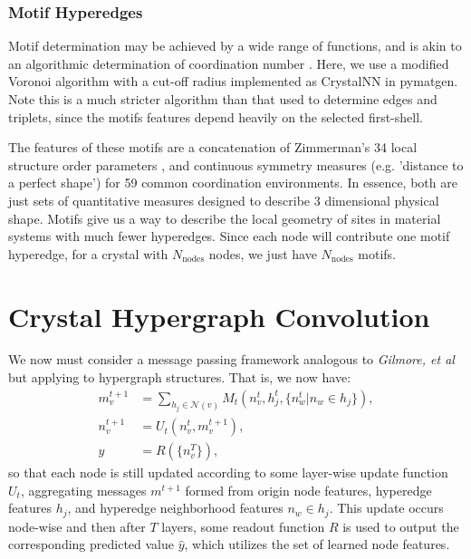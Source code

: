 \documentclass[10pt,a4paper,twocolumn]{article}
\begin{document}






\subsubsection{Motif Hyperedges}
Motif determination may be achieved by a wide range of functions, and is akin to an algorithmic determination of coordination number \cite{coordination_comp}. Here, we use a modified Voronoi algorithm with a cut-off radius implemented as CrystalNN in pymatgen.
Note this is a much stricter algorithm than that used to determine edges and triplets, since the motifs features depend heavily on the selected first-shell.

The features of these motifs are a concatenation of Zimmerman's 34 local structure order parameters \cite{orderparam1,orderparam2}, and continuous symmetry measures \cite{csm_polyhedra} (e.g. 'distance to a perfect shape') for 59 common coordination environments. In essence, both are just sets of quantitative measures designed to describe 3 dimensional physical shape. 
Motifs give us a way to describe the local geometry of sites in material systems with much fewer hyperedges. Since each node will contribute one motif hyperedge, for a crystal with $N_{\text{nodes}}$ nodes, we just have $N_{\text{nodes}}$ motifs. 


\section{Crystal Hypergraph Convolution}

We now must consider a message passing framework analogous to \textit{Gilmore, et al} \cite{mpnn} but applying to hypergraph structures. That is, we now have:
\begin{align*}
	m_v^{t+1}&=\sum_{h_j\in \mathcal{N}(v)} M_t(n_v^{t},h_j^{t},\lbrace n_w^t \vert n_w \in h_j \rbrace),\\
	n_v^{t+1}&=U_t(n_v^t,m_v^{t+1}),\\
	\hat{y}&=R(\lbrace n_v^T\rbrace),
\end{align*}
so that each node is still updated according to some layer-wise update function $U_t$, aggregating messages $m^{t+1}$ formed from origin node features, hyperedge features $h_j$, and hyperedge neighborhood features $n_w \in h_j$. This update occurs node-wise and then after $T$ layers, some readout function $R$ is used to output the corresponding predicted value $\hat{y}$, which utilizes the set of learned node features.
\end{document}

